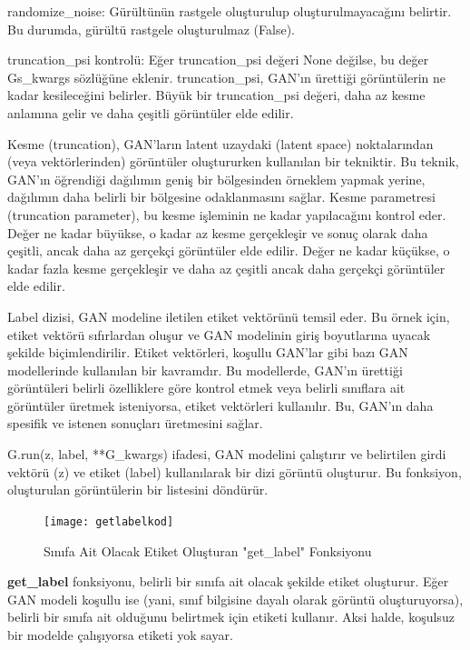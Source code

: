 \documentclass[12pt, a4paper]{article}
\begin{document}
	randomize\_noise: Gürültünün rastgele oluşturulup oluşturulmayacağını belirtir. Bu durumda, gürültü rastgele oluşturulmaz (False)\cite{ChatGPT-2024-05-29}.
	
	truncation\_psi kontrolü: Eğer truncation\_psi değeri None değilse, bu değer Gs\_kwargs sözlüğüne eklenir. truncation\_psi, GAN'ın ürettiği görüntülerin ne kadar kesileceğini belirler. Büyük bir truncation\_psi değeri, daha az kesme anlamına gelir ve daha çeşitli görüntüler elde edilir.
	
	Kesme (truncation), GAN'ların latent uzaydaki (latent space) noktalarından (veya vektörlerinden) görüntüler oluştururken kullanılan bir tekniktir. Bu teknik, GAN'ın öğrendiği dağılımın geniş bir bölgesinden örneklem yapmak yerine, dağılımın daha belirli bir bölgesine odaklanmasını sağlar. Kesme parametresi (truncation parameter), bu kesme işleminin ne kadar yapılacağını kontrol eder. Değer ne kadar büyükse, o kadar az kesme gerçekleşir ve sonuç olarak daha çeşitli, ancak daha az gerçekçi görüntüler elde edilir. Değer ne kadar küçükse, o kadar fazla kesme gerçekleşir ve daha az çeşitli ancak daha gerçekçi görüntüler elde edilir.
	
	Label dizisi, GAN modeline iletilen etiket vektörünü temsil eder. Bu örnek için, etiket vektörü sıfırlardan oluşur ve GAN modelinin giriş boyutlarına uyacak şekilde biçimlendirilir.
	Etiket vektörleri, koşullu GAN'lar gibi bazı GAN modellerinde kullanılan bir kavramdır. Bu modellerde, GAN'ın ürettiği görüntüleri belirli özelliklere göre kontrol etmek veya belirli sınıflara ait görüntüler üretmek isteniyorsa, etiket vektörleri kullanılır. Bu, GAN'ın daha spesifik ve istenen sonuçları üretmesini sağlar. 
	
	G.run(z, label, **G\_kwargs) ifadesi, GAN modelini çalıştırır ve belirtilen girdi vektörü (z) ve etiket (label) kullanılarak bir dizi görüntü oluşturur. Bu fonksiyon, oluşturulan görüntülerin bir listesini döndürür.
	
	\begin{figure}[h]
		\centering
		\texttt{[image: getlabelkod]}
		\label{getlabelkod}
		\caption{Sınıfa Ait Olacak Etiket Oluşturan "get\_label" Fonksiyonu}
	\end{figure}
	\FloatBarrier
	\textbf{get\_label} fonksiyonu, belirli bir sınıfa ait olacak şekilde etiket oluşturur. Eğer GAN modeli koşullu ise (yani, sınıf bilgisine dayalı olarak görüntü oluşturuyorsa), belirli bir sınıfa ait olduğunu belirtmek için etiketi kullanır. Aksi halde, koşulsuz bir modelde çalışıyorsa etiketi yok sayar.
	
\end{document}
